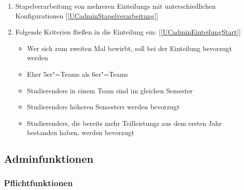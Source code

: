 \documentclass[parskip=full]{scrartcl}
\newcommand{\swtLabel}[1]{\textbf{/#1\arabic*0/}}
\newcommand{\testRef}[1]{[\ref{#1}]}
\begin{document}
 \begin{enumerate}[label=\swtLabel{FA}, resume]
 \item Stapelverarbeitung von mehreren \glspl{Einteilung} mit unterschiedlichen
 Konfigurationen \label{FAeinteilungStapel} \testRef{UCadminStapelverarbeitung}
 \item Folgende Kriterien fließen in die \gls{Einteilung} ein:
 \testRef{UCadminEinteilungStart}
 \begin{itemize}
 	\item Wer sich zum zweiten Mal bewirbt, soll bei der \gls{Einteilung} bevorzugt
 	werden
 	\item Eher 5er"=\glspl{Team} als 6er"=\glspl{Team}
 	\item \glspl{Studierender} in einem \gls{Team} sind im gleichen Semester
 	\item \glspl{Studierender} höheren Semesters werden bevorzugt
 	\item \glspl{Studierender}, die bereits mehr \glspl{Teilleistung} aus dem ersten Jahr
 	bestanden haben, werden bevorzugt
 \end{itemize} \label{FAeinteilungWunschKriterien}
 
\end{enumerate}


\subsection{Adminfunktionen}

\subsubsection{Pflichtfunktionen}
\end{document}
